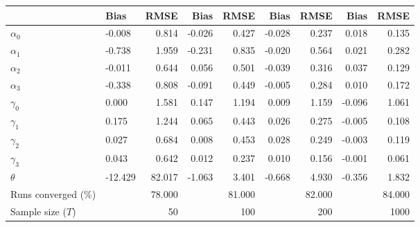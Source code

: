 
\begin{tabular}[t]{llrrrrrrr}
\toprule
  & Bias & RMSE & Bias & RMSE & Bias & RMSE & Bias & RMSE\\
\midrule
$\alpha_{0}$ & -0.008 & 0.814 & -0.026 & 0.427 & -0.028 & 0.237 & 0.018 & 0.135\\
$\alpha_{1}$ & -0.738 & 1.959 & -0.231 & 0.835 & -0.020 & 0.564 & 0.021 & 0.282\\
$\alpha_{2}$ & -0.011 & 0.644 & 0.056 & 0.501 & -0.039 & 0.316 & 0.037 & 0.129\\
$\alpha_{3}$ & -0.338 & 0.808 & -0.091 & 0.449 & -0.005 & 0.284 & 0.010 & 0.172\\
$\gamma_{0}$ & 0.000 & 1.581 & 0.147 & 1.194 & 0.009 & 1.159 & -0.096 & 1.061\\
$\gamma_{1}$ & 0.175 & 1.244 & 0.065 & 0.443 & 0.026 & 0.275 & -0.005 & 0.108\\
$\gamma_{2}$ & 0.027 & 0.684 & 0.008 & 0.453 & 0.028 & 0.249 & -0.003 & 0.119\\
$\gamma_{3}$ & 0.043 & 0.642 & 0.012 & 0.237 & 0.010 & 0.156 & -0.001 & 0.061\\
$\theta$ & -12.429 & 82.017 & -1.063 & 3.401 & -0.668 & 4.930 & -0.356 & 1.832\\
Runs converged (\%) &  & 78.000 &  & 81.000 &  & 82.000 &  & 84.000\\
Sample size ($T$) &  & 50 &  & 100 &  & 200 &  & 1000\\
\bottomrule
\end{tabular}
